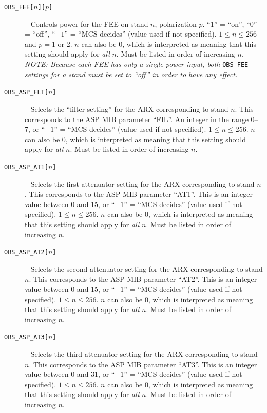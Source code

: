 \begin{description}
\item[\texttt{OBS\_FEE[$n$][$p$]}] -- Controls power for the FEE on stand $n$, polarization $p$.  ``1'' = ``on'', ``0'' = ``off'', ``$-1$'' = ``MCS decides'' (value used if not specified).  $1 \le n \le 256$ and $p = 1$ or 2.  $n$ can also be 0, which is interpreted as meaning that this setting should apply for \textit{all} $n$.  Must be listed in order of increasing $n$.  \textit{NOTE: Because each FEE has only a single power input, both} \texttt{OBS\_FEE} \textit{settings for a stand must be set to ``off'' in order to have any effect.}

\item[\texttt{OBS\_ASP\_FLT[$n$]}] -- Selects the ``filter setting'' for the ARX corresponding to stand $n$.  This corresponds to the ASP MIB parameter ``FIL''.  An integer in the range 0--7, or ``$-1$'' = ``MCS decides'' (value used if not specified).  $1 \le n \le 256$.  $n$ can also be 0, which is interpreted as meaning that this setting should apply for \textit{all} $n$.  Must be listed in order of increasing $n$.

\item[\texttt{OBS\_ASP\_AT1[$n$]}] -- Selects the first attenuator setting for the ARX corresponding to stand $n$.  This corresponds to the ASP MIB parameter ``AT1''.  This is an integer value between 0 and 15, or ``$-1$'' = ``MCS decides'' (value used if not specified).  $1 \le n \le 256$.  $n$ can also be 0, which is interpreted as meaning that this setting should apply for \textit{all} $n$.  Must be listed in order of increasing $n$.

\item[\texttt{OBS\_ASP\_AT2[$n$]}] -- Selects the second attenuator setting for the ARX corresponding to stand $n$.  This corresponds to the ASP MIB parameter ``AT2''.  This is an integer value between 0 and 15, or ``$-1$'' = ``MCS decides'' (value used if not specified).  $1 \le n \le 256$.  $n$ can also be 0, which is interpreted as meaning that this setting should apply for \textit{all} $n$.  Must be listed in order of increasing $n$.

\item[\texttt{OBS\_ASP\_AT3[$n$]}] -- Selects the third attenuator setting for the ARX corresponding to stand $n$.  This corresponds to the ASP MIB parameter ``AT3''.  This is an integer value between 0 and 31, or ``$-1$'' = ``MCS decides'' (value used if not specified).  $1 \le n \le 256$.  $n$ can also be 0, which is interpreted as meaning that this setting should apply for \textit{all} $n$.  Must be listed in order of increasing $n$.


\end{description}
